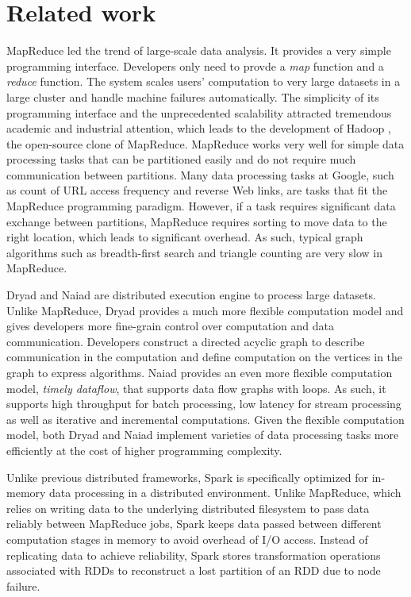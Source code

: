\section{Related work}
MapReduce \cite{mapreduce} led the trend of large-scale data analysis. It
provides a very simple programming interface. Developers only need to provde
a \textit{map} function and
a \textit{reduce} function. The system scales users' computation to very large
datasets in a large cluster and handle machine failures automatically.
The simplicity of its programming interface and the unprecedented scalability
attracted tremendous academic and industrial attention, which leads to
the development of Hadoop \cite{hadoop}, the open-source clone of MapReduce.
MapReduce works very well for simple data processing tasks that can be
partitioned easily and do not require much communication between partitions.
Many data processing tasks at Google, such as count of URL access frequency
and reverse Web links, are tasks that fit the MapReduce programming paradigm.
However, if a task requires significant data exchange between partitions,
MapReduce requires sorting to move data to the right location, which leads
to significant overhead. As such, typical graph algorithms such as breadth-first
search and triangle counting are very slow in MapReduce.

Dryad \cite{dryad} and Naiad \cite{naiad} are distributed execution engine to
process
large datasets. Unlike MapReduce, Dryad provides a much more flexible computation
model and gives developers more fine-grain control over computation and data
communication. Developers construct a directed acyclic graph to describe
communication in the computation and define computation on the vertices in
the graph to express algorithms. Naiad provides an even more
flexible computation model, \textit{timely dataflow}, that supports data flow
graphs with loops. As such, it supports high throughput for batch processing,
low latency for stream processing as well as iterative and incremental
computations. Given the flexible computation model, both Dryad and Naiad
implement varieties of data processing tasks more efficiently at the cost of
higher programming complexity.

Unlike previous distributed frameworks, Spark \cite{spark} is specifically
optimized for in-memory data processing in a distributed environment.
Unlike MapReduce, which relies on writing data to the underlying distributed
filesystem to pass data reliably between MapReduce jobs, Spark keeps data
passed between different computation stages in memory
to avoid overhead of I/O access. Instead of replicating data to achieve
reliability, Spark stores transformation operations associated with RDDs to
reconstruct a lost partition of an RDD due to node failure.

